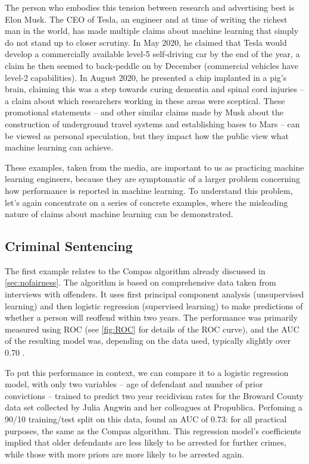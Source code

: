 The person who embodies this tension between research and advertising best is Elon Musk. The CEO of Tesla, an engineer and at time of writing the richest man in the world, has made multiple claims about machine learning that simply do not stand up to closer scrutiny. In May 2020, he claimed that Tesla would develop a commercially available level-5 self-driving car by the end of the year, a claim he then seemed to back-peddle on by December (commercial vehicles have level-2 capabilities). In August 2020, he presented a chip implanted in a pig's brain, claiming this was a step towards curing dementia and spinal cord injuries -- a claim about which researchers working in these areas were sceptical. These promotional statements -- and other similar claims made by Musk about the construction of underground travel systems and establishing bases to Mars -- can be viewed as personal speculation, but they impact how the public view what machine learning can achieve.

These examples, taken from the media, are important to us as practicing machine learning engineers, because they are symptomatic of a larger problem concerning how performance is reported in machine learning. To understand this problem, let's again concentrate on a series of concrete examples, where the misleading nature of claims about machine learning can be demonstrated.

\subsection{Criminal Sentencing}

The first example relates to the Compas algorithm already discussed in \cref{sec:nofairness}. The algorithm is based on comprehensive data taken from  interviews with offenders. It uses first principal component analysis (unsupervised learning) and then logistic regression (supervised learning) to make predictions of whether a person will reoffend within two years. The performance was primarily measured using ROC (see \cref{fig:ROC} for details of the ROC curve), and the AUC of the resulting model was, depending on the data used, typically slightly over 0.70 \parencite{brennan2009evaluating}.

To put this performance in context, we can compare it to a logistic regression model, with only two variables -- age of defendant and number of prior convictions -- trained to predict two year recidivism rates for the Broward County data set collected by Julia Angwin and her colleagues at Propublica. Perfoming a 90/10 training/test split on this data, \textcite{sumpter2018outnumbered} found an AUC of 0.73: for all practical purposes, the same as the Compas algorithm. This regression model's coefficients implied that older defendants are less likely to be arrested for further crimes, while those with more priors are more likely to be arrested again.

